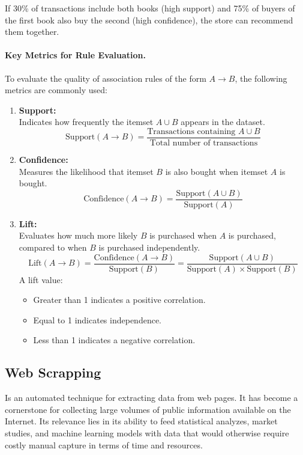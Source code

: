 \documentclass{svproc} %
\begin{document}
	If 30\% of transactions include both books (high support) and 75\% of buyers of the first book also buy the second (high confidence), the store can recommend them together.
	\paragraph{Key Metrics for Rule Evaluation.}
	
	To evaluate the quality of association rules of the form \( A \rightarrow B \), the following metrics are commonly used:
	
	\begin{enumerate}
		\item \textbf{Support:} \\
		Indicates how frequently the itemset \( A \cup B \) appears in the dataset.
		\[
		\text{Support}(A \rightarrow B) = \frac{\text{Transactions containing } A \cup B}{\text{Total number of transactions}}
		\]
		
		\item \textbf{Confidence:} \\
		Measures the likelihood that itemset \( B \) is also bought when itemset \( A \) is bought.
		\[
		\text{Confidence}(A \rightarrow B) = \frac{\text{Support}(A \cup B)}{\text{Support}(A)}
		\]
		
		\item \textbf{Lift:} \\
		Evaluates how much more likely \( B \) is purchased when \( A \) is purchased, compared to when \( B \) is purchased independently.
		\[
		\text{Lift}(A \rightarrow B) = \frac{\text{Confidence}(A \rightarrow B)}{\text{Support}(B)} = \frac{\text{Support}(A \cup B)}{\text{Support}(A) \times \text{Support}(B)}
		\]
		A lift value:
		\begin{itemize}
			\item Greater than 1 indicates a positive correlation.
			\item Equal to 1 indicates independence.
			\item Less than 1 indicates a negative correlation.
		\end{itemize}
	\end{enumerate}
	
	\subsection{Web Scrapping}
	
	Is an automated technique for extracting data from web pages. It has become a cornerstone for collecting large volumes of public information available on the Internet. Its relevance lies in its ability to feed statistical analyzes, market studies, and machine learning models with data that would otherwise require costly manual capture in terms of time and resources. \cite{gfg_web_scraping}
	
\end{document}

